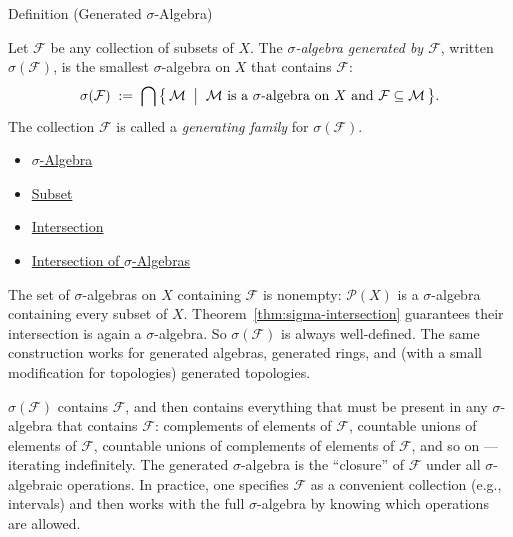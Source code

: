 \begin{definitionbox}{Definition (Generated $\sigma$-Algebra)}
\begin{definition}\label{def:generated-sigma}
Let $\mathcal{F}$ be any collection of subsets of $X$. The
\emph{$\sigma$-algebra generated by $\mathcal{F}$}, written $\sigma(\mathcal{F})$,
is the smallest $\sigma$-algebra on $X$ that contains $\mathcal{F}$:
\[
\sigma(\mathcal{F})
\;:=\;
\bigcap\,\bigl\{\, \mathcal{M} \;\bigm|\;
\mathcal{M} \text{ is a $\sigma$-algebra on } X
\text{ and } \mathcal{F} \subseteq \mathcal{M} \,\bigr\}.
\]
The collection $\mathcal{F}$ is called a \emph{generating family} for
$\sigma(\mathcal{F})$.
\end{definition}
\end{definitionbox}

\begin{dependencies}
\begin{itemize}
  \item \hyperref[def:sigma-algebra]{$\sigma$-Algebra}
  \item \hyperref[def:subset]{Subset}
  \item \hyperref[def:intersection]{Intersection}
  \item \hyperref[thm:sigma-intersection]{Intersection of $\sigma$-Algebras}
\end{itemize}
\end{dependencies}

\begin{remark*}
The set of $\sigma$-algebras on $X$ containing $\mathcal{F}$ is nonempty:
$\mathcal{P}(X)$ is a $\sigma$-algebra containing every subset of $X$.
Theorem~\ref{thm:sigma-intersection} guarantees their intersection is again a
$\sigma$-algebra. So $\sigma(\mathcal{F})$ is always well-defined. The same
construction works for generated algebras, generated rings, and (with a small
modification for topologies) generated topologies.
\end{remark*}

\begin{remark*}
$\sigma(\mathcal{F})$ contains $\mathcal{F}$, and then contains everything
that must be present in any $\sigma$-algebra that contains $\mathcal{F}$:
complements of elements of $\mathcal{F}$, countable unions of elements of
$\mathcal{F}$, countable unions of complements of elements of $\mathcal{F}$,
and so on — iterating indefinitely. The generated $\sigma$-algebra is the
``closure'' of $\mathcal{F}$ under all $\sigma$-algebraic operations. In
practice, one specifies $\mathcal{F}$ as a convenient collection (e.g.,
intervals) and then works with the full $\sigma$-algebra by knowing which
operations are allowed.
\end{remark*}

